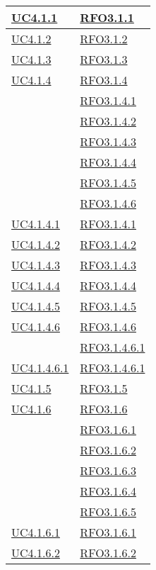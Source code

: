 \begin{longtable}{|>{\centering}m{5cm}|m{5cm}<{\centering}|}
\hyperref[UC4.1.1]{UC4.1.1} & \hyperlink{RFO3.1.1}{RFO3.1.1}\\ \hline
\hyperref[UC4.1.2]{UC4.1.2} & \hyperlink{RFO3.1.2}{RFO3.1.2}\\ \hline
\hyperref[UC4.1.3]{UC4.1.3} & \hyperlink{RFO3.1.3}{RFO3.1.3}\\ \hline
\hyperref[UC4.1.4]{UC4.1.4} & \hyperlink{RFO3.1.4}{RFO3.1.4}\\
& \hyperlink{RFO3.1.4.1}{RFO3.1.4.1}\\
& \hyperlink{RFO3.1.4.2}{RFO3.1.4.2}\\
& \hyperlink{RFO3.1.4.3}{RFO3.1.4.3}\\
& \hyperlink{RFO3.1.4.4}{RFO3.1.4.4}\\
& \hyperlink{RFO3.1.4.5}{RFO3.1.4.5}\\
& \hyperlink{RFO3.1.4.6}{RFO3.1.4.6}\\ \hline
\hyperref[UC4.1.4.1]{UC4.1.4.1} & \hyperlink{RFO3.1.4.1}{RFO3.1.4.1}\\ \hline
\hyperref[UC4.1.4.2]{UC4.1.4.2} & \hyperlink{RFO3.1.4.2}{RFO3.1.4.2}\\ \hline
\hyperref[UC4.1.4.3]{UC4.1.4.3} & \hyperlink{RFO3.1.4.3}{RFO3.1.4.3}\\ \hline
\hyperref[UC4.1.4.4]{UC4.1.4.4} & \hyperlink{RFO3.1.4.4}{RFO3.1.4.4}\\ \hline
\hyperref[UC4.1.4.5]{UC4.1.4.5} & \hyperlink{RFO3.1.4.5}{RFO3.1.4.5}\\ \hline
\hyperref[UC4.1.4.6]{UC4.1.4.6} & \hyperlink{RFO3.1.4.6}{RFO3.1.4.6}\\
& \hyperlink{RFO3.1.4.6.1}{RFO3.1.4.6.1}\\ \hline
\hyperref[UC4.1.4.6.1]{UC4.1.4.6.1} & \hyperlink{RFO3.1.4.6.1}{RFO3.1.4.6.1}\\ \hline
\hyperref[UC4.1.5]{UC4.1.5} & \hyperlink{RFO3.1.5}{RFO3.1.5}\\ \hline
\hyperref[UC4.1.6]{UC4.1.6} & \hyperlink{RFO3.1.6}{RFO3.1.6}\\
& \hyperlink{RFO3.1.6.1}{RFO3.1.6.1}\\
& \hyperlink{RFO3.1.6.2}{RFO3.1.6.2}\\
& \hyperlink{RFO3.1.6.3}{RFO3.1.6.3}\\
& \hyperlink{RFO3.1.6.4}{RFO3.1.6.4}\\
& \hyperlink{RFO3.1.6.5}{RFO3.1.6.5}\\ \hline
\hyperref[UC4.1.6.1]{UC4.1.6.1} & \hyperlink{RFO3.1.6.1}{RFO3.1.6.1}\\ \hline
\hyperref[UC4.1.6.2]{UC4.1.6.2} & \hyperlink{RFO3.1.6.2}{RFO3.1.6.2}\\ \hline

\end{longtable}
